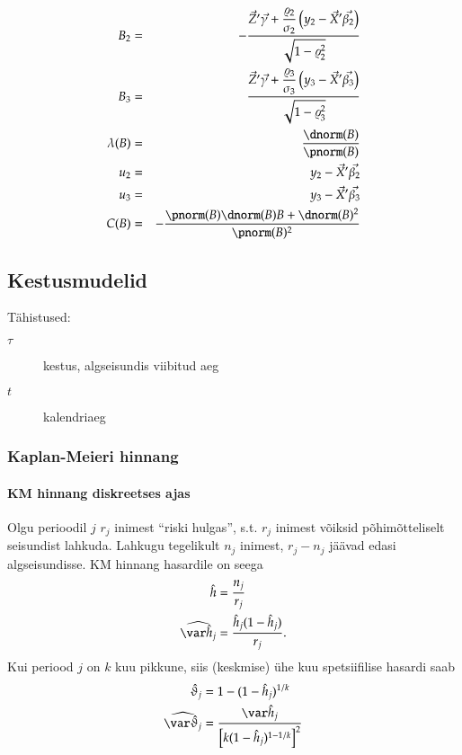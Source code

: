 \documentclass[a4paper]{article}
\numberwithin{equation}{subsection}
\begin{document}
\begin{eqnarray}
B_2 &=& -\frac
    {\vec{Z}'\vec{\gamma} + \displaystyle \frac{\varrho_2}{\sigma_2}
      \left( y_2 - \vec{X}'\vec{\beta_2} \right)}
    {\sqrt{ 1 - \varrho_2^2}} \\
B_3 &=& \frac
    {\vec{Z}'\vec{\gamma} + \displaystyle \frac{\varrho_3}{\sigma_3}
      \left( y_3 - \vec{X}'\vec{\beta_3} \right)}
    {\sqrt{ 1 - \varrho_3^2}}\\
\lambda( B) &=& \frac{\dnorm(B)}{\pnorm(B)}\\
u_2 &=& y_2 - \vec{X}'\vec{\beta_2}\\
u_3 &=& y_3 - \vec{X}'\vec{\beta_3}\\
C(B) &=& -\frac{\pnorm(B) \dnorm(B) B + \dnorm(B)^2}{\pnorm(B)^2}
\end{eqnarray}


\newpage
\subsection{Kestusmudelid}

Tähistused:
\begin{description}
\item[$\tau$] kestus, algseisundis viibitud aeg
\item[$t$] kalendriaeg
\end{description}


\subsubsection{Kaplan-Meieri hinnang}

\paragraph{KM hinnang diskreetses ajas}
Olgu perioodil $j$ $r_j$ inimest ``riski hulgas'', s.t. $r_j$ inimest
võiksid põhimõtteliselt seisundist lahkuda.  Lahkugu tegelikult $n_j$
inimest, $r_j - n_j$ jäävad edasi algseisundisse.  KM hinnang
hasardile on seega
\begin{align}
  \label{eq:KM_hinnang}
  \hat h &= \frac{n_j}{r_j}\\
  \widehat{\var\hat h_j} &= \frac{\hat h_j(1 - \hat h_j)}{r_j}.
\end{align}
Kui periood $j$ on $k$ kuu pikkune, siis (keskmise) ühe kuu
spetsiifilise hasardi saab
\begin{align}
  \hat\vartheta_j &= 1 - (1 - \hat h_j)^{1/k}\\
  \widehat{\var\hat\vartheta_j} &=
  \frac{\var\hat h_j}
  {\left[ k(1 - \hat h_j)^{1 - 1/k} \right]^2}
\end{align}
\end{document}
